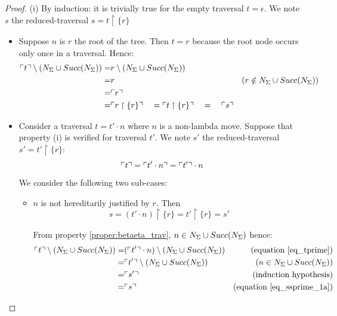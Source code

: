 \begin{proof}
(i) By induction: it is trivially true for the empty traversal $t =
\epsilon$. We note $s$ the reduced-traversal $s = t \upharpoonright
\{ r \}$
\begin{itemize}
\item Suppose $n$ is $r$ the root of the tree. Then $t = r$ because the root node occurs only once in a traversal. Hence:
    \begin{eqnarray*}
    \ulcorner t \urcorner \setminus \left( N_\Sigma \cup Succ(N_\Sigma) \right)
    =& r \setminus \left( N_\Sigma \cup Succ(N_\Sigma) \right) \\
    =& r  & (r \notin N_\Sigma \cup Succ(N_\Sigma))  \\
    =& \ulcorner r \urcorner \\
    =& \ulcorner r  \upharpoonright \{ r \} \urcorner \quad
    = \ulcorner t  \upharpoonright \{ r \} \urcorner \quad
    = \quad \ulcorner s \urcorner
    \end{eqnarray*}

\item Consider a traversal $t = t' \cdot n$ where $n$ is a non-lambda
move. Suppose that property (i) is verified for traversal $t'$. We
note $s'$ the reduced-traversal $s' = t' \upharpoonright \{ r \}$:
    \begin{equation}
    \ulcorner t \urcorner = \ulcorner t' \cdot n \urcorner = \ulcorner t' \urcorner \cdot n  \label{eq_tprime}
    \end{equation}

    We consider the following two sub-cases:
    \begin{itemize}
    \item $n$ is not hereditarily justified by $r$. Then
    \begin{equation}
    s = (t' \cdot n) \upharpoonright \{ r \} = t' \upharpoonright \{ r \} = s' \label{eq_ssprime_1a}
    \end{equation}

    From property \ref{proper:betaeta_trav}, $n \in N_\Sigma \cup Succ(N_\Sigma)$ hence:
    \begin{eqnarray*}
    \ulcorner t \urcorner \setminus \left( N_\Sigma \cup Succ(N_\Sigma) \right)
    =& (\ulcorner t' \urcorner \cdot n) \setminus \left( N_\Sigma \cup Succ(N_\Sigma) \right) & \mbox{(equation \ref{eq_tprime})} \\
    =& \ulcorner t' \urcorner \setminus \left( N_\Sigma \cup Succ(N_\Sigma) \right) & (n \in N_\Sigma \cup Succ(N_\Sigma)) \\
    =& \ulcorner s' \urcorner & \mbox{(induction hypothesis)} \\
    =& \ulcorner s \urcorner & \mbox{(equation \ref{eq_ssprime_1a})}
    \end{eqnarray*}


\end{itemize}
\end{itemize}
\end{proof}
